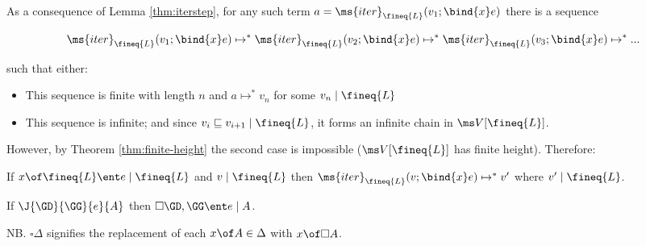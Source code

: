 \documentclass{article}
\newcommand{\ale}{\sqsubseteq}
\newcommand{\iter}[4]{\ms{iter}_{#1}({#2}; \bind{#3}#4)}
\newcommand{\step}{\mapsto}
\newcommand{\steps}{\step^*}
\newcommand{\disc}[1]{\square{#1}}
\newcommand{\lr}[2]{#2\mathrel{|}#1}
\newcommand{\lrcx}[3]{#1 \ent \lr{#2}{#3}}
\begin{document}
As a consequence of Lemma \ref{thm:iterstep}, for any such term $a =
\iter{\fineq{L}}{v_1}{x}{e}$ there is a sequence

\[ \iter{\fineq{L}}{v_1}{x}{e} \steps
\iter{\fineq{L}}{v_2}{x}{e} \steps
\iter{\fineq{L}}{v_3}{x}{e} \steps ... \]

such that either:
\begin{itemize}
\item This sequence is finite with length $n$ and $a \steps v_n$ for some
  $\lr{\fineq{L}}{v_n}$
\item This sequence is infinite; and since $\lr{\fineq{L}}{v_i \ale v_{i+1}}$,
  it forms an infinite chain in $\Val{\fineq{L}}$.
\end{itemize}

However, by Theorem \ref{thm:finite-height} the second case is impossible
($\Val{\fineq{L}}$ has finite height). Therefore:
\begin{theorem}
  If $\lrcx{x \of \fineq{L}}{\fineq{L}}{e}$ and $\lr{\fineq{L}}{v}$ then
  $\iter{\fineq{L}}{v}{x}{e} \steps v'$ where $\lr{\fineq{L}}{v'}$.
\end{theorem}


\newcommand{\cxdisc}[1]{\disc{#1}}

\begin{theorem}
  If $\J{\GD}{\GG}{e}{A}$ then $\lrcx{\cxdisc{\GD},\GG}{A}{e}$.
\end{theorem}

NB. $\cxdisc{\Delta}$ signifies the replacement of each $x \of A \in \Delta$
with $x \of \disc{A}$.
\end{document}
